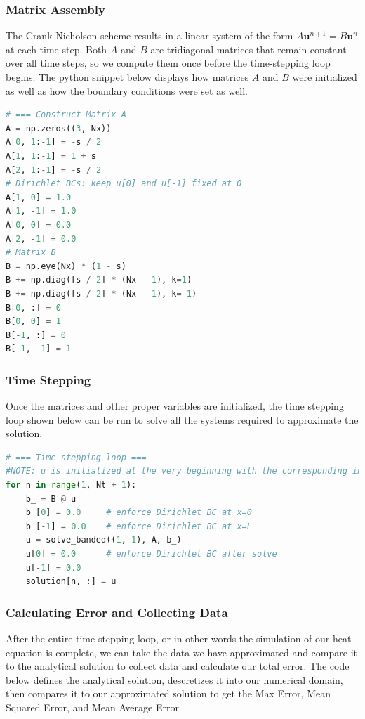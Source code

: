 \documentclass[12pt, reqno]{amsart}
\begin{document}
\subsubsection{Matrix Assembly}
The Crank-Nicholson scheme results in a linear system of the form $A \mathbf{u}^{n+1} = B \mathbf{u}^n$ at each time step. Both $A$ and $B$ are tridiagonal matrices that remain constant over all time steps, so we compute them once before the time-stepping loop begins. The python snippet below displays how matrices $A$ and $B$ were initialized as well as how the boundary conditions were set as well.
\begin{lstlisting}[language=Python, title=Matrix Construction]
# === Construct Matrix A
A = np.zeros((3, Nx))
A[0, 1:-1] = -s / 2
A[1, 1:-1] = 1 + s
A[2, 1:-1] = -s / 2
# Dirichlet BCs: keep u[0] and u[-1] fixed at 0
A[1, 0] = 1.0
A[1, -1] = 1.0
A[0, 0] = 0.0
A[2, -1] = 0.0
# Matrix B
B = np.eye(Nx) * (1 - s)
B += np.diag([s / 2] * (Nx - 1), k=1)
B += np.diag([s / 2] * (Nx - 1), k=-1)  
B[0, :] = 0
B[0, 0] = 1
B[-1, :] = 0
B[-1, -1] = 1
\end{lstlisting}

\subsubsection{Time Stepping}
Once the matrices and other proper variables are initialized, the time stepping loop shown below can be run to solve all the systems required to approximate the solution.


\begin{lstlisting}[language=Python, title = Time Stepping Loop]
# === Time stepping loop ===
#NOTE: u is initialized at the very beginning with the corresponding intial condition as u = sin(pi*x), the variable Nt is the total number of time steps, initialized as 20,000
for n in range(1, Nt + 1):
    b_ = B @ u
    b_[0] = 0.0     # enforce Dirichlet BC at x=0
    b_[-1] = 0.0    # enforce Dirichlet BC at x=L
    u = solve_banded((1, 1), A, b_)
    u[0] = 0.0      # enforce Dirichlet BC after solve
    u[-1] = 0.0
    solution[n, :] = u
\end{lstlisting}

\subsubsection{Calculating Error and Collecting Data}
After the entire time stepping loop, or in other words the simulation of our heat equation is complete, we can take the data we have approximated and compare it to the analytical solution to collect data and calculate our total error. The code below defines the analytical solution, descretizes it into our numerical domain, then compares it to our approximated solution to get the Max Error, Mean Squared Error, and Mean Average Error
\end{document}
